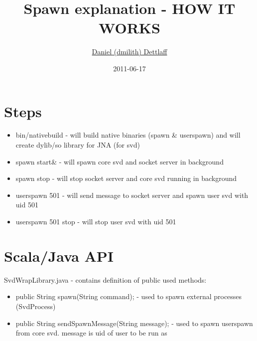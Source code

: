 \documentclass[11pt,a4paper]{report}
\title{Spawn explanation - HOW IT WORKS}
\author{\href{mailto:dmilith@verknowsys.com}{Daniel (dmilith) Dettlaff}}
\date{2011-06-17}
\begin{document}
\maketitle

\section{Steps}\label{sec:steps}
	\begin{itemize}
		\item bin/nativebuild - will build native binaries (spawn \& userspawn) and will create dylib/so library for JNA (for svd)
		\item spawn start\& - will spawn core svd and socket server in background
		\item spawn stop - will stop socket server and core svd running in background
		\item userspawn 501 - will send message to socket server and spawn user svd with uid 501
		\item userspawn 501 stop - will stop user svd with uid 501
	\end{itemize}

\section{Scala/Java API}\label{sec:steps}
	SvdWrapLibrary.java - contains definition of public used methods:
	\begin{itemize}
		\item public String spawn(String command); - used to spawn external processes (SvdProcess)
		\item public String sendSpawnMessage(String message); - used to spawn userspawn from core svd. message is uid of user to be run as
	\end{itemize}
\end{document}
